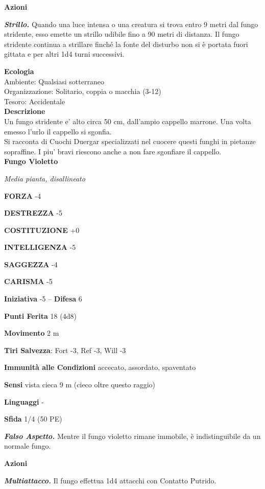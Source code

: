 \begin{multicols}{2}
\textbf{Azioni}

\emph{\textbf{Strillo.}} Quando una luce intensa o una creatura si trova entro 9 metri dal fungo stridente, esso emette un strillo udibile fino a 90 metri di distanza. Il fungo stridente continua a strillare finché la fonte del disturbo non si è portata fuori gittata e per altri 1d4 turni successivi.

\textbf{Ecologia}\\
Ambiente: Qualsiasi sotterraneo\\
Organizzazione: Solitario, coppia o macchia (3-12)\\
Tesoro: Accidentale\\
\textbf{Descrizione}\\
Un fungo stridente e' alto circa 50 cm, dall'ampio cappello marrone. Una volta emesso l'urlo il cappello si sgonfia. \\
Si racconta di Cuochi Duergar specializzati nel cuocere questi funghi in pietanze sopraffine.
I piu' bravi riescono anche a non fare sgonfiare il cappello.\\


\medskip{}\textbf{Fungo Violetto}

\emph{Media pianta, disallineato}

\textbf{FORZA} -4

\textbf{DESTREZZA} -5

\textbf{COSTITUZIONE} +0

\textbf{INTELLIGENZA} -5

\textbf{SAGGEZZA} -4

\textbf{CARISMA} -5

\textbf{Iniziativa} -5 -- \textbf{Difesa} 6

\textbf{Punti Ferita} 18 (4d8)

\textbf{Movimento} 2 m

\textbf{Tiri Salvezza}: Fort -3, Ref -3, Will -3

\textbf{Immunità alle Condizioni} accecato, assordato, spaventato 

\textbf{Sensi} vista cieca 9 m (cieco oltre questo raggio)

\textbf{Linguaggi} -

\textbf{Sfida} 1/4 (50 PE)

\emph{\textbf{Falso Aspetto.}} Mentre il fungo violetto rimane immobile, è indistinguibile da un normale fungo.

\textbf{Azioni}

\emph{\textbf{Multiattacco.}} Il fungo effettua 1d4 attacchi con Contatto Putrido.


\end{multicols}
